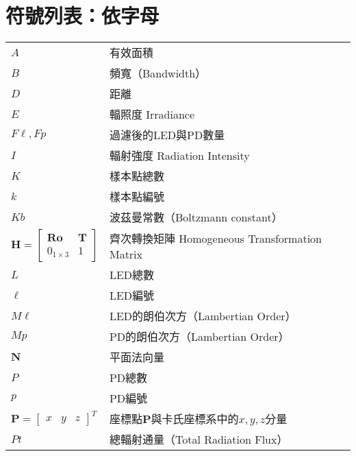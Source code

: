 \chapter*{符號列表：依字母}
\label{chp:symbol_alphabet}




\begin{longtable}[l]{ll}
    $A$ & 有效面積\\
    $B$& 頻寬（Bandwidth）\\

    $D$&距離\\

    $E$ & 輻照度 Irradiance\\
    $F\ell,Fp$ & 過濾後的LED與PD數量\\

    $I$ & 輻射強度 Radiation Intensity\\

    $K$&樣本點總數\\
    $k$&樣本點編號\\
    $Kb$&波茲曼常數（Boltzmann constant）\\

    $\boldsymbol{H}=\left[\begin{array}{cc}
        \boldsymbol{Ro}  & \boldsymbol{T} \\
        0_{1\times3} & 1
        \end{array}\right]$ & 齊次轉換矩陣 Homogeneous Transformation Matrix\\
        
    $L$ & LED總數\\
    $\ell$ & LED編號\\

    $M\ell$ & LED的朗伯次方（Lambertian Order）\\
    $Mp$ & PD的朗伯次方（Lambertian Order）\\

    $\boldsymbol{N}$& 平面法向量\\
    
    $P$ & PD總數\\
    $p$ & PD編號\\
    $\boldsymbol{P} =
        \left[\begin{array}{ccc}
        x &y&z
       \end{array}\right]^T $ & 座標點$\boldsymbol{P}$與卡氏座標系中的$x,y,z$分量\\
    $Pt$ & 總輻射通量（Total Radiation Flux）\\ 


\end{longtable}
